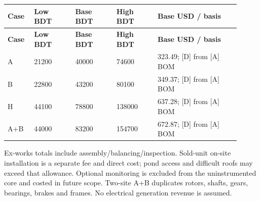 \documentclass[11pt,a4paper]{article}
\begin{document}
{\small
\setlength{\tabcolsep}{3pt}\renewcommand{\arraystretch}{1.18}
\begin{longtable}{@{}>{\raggedright\arraybackslash}p{0.1071\linewidth}>{\raggedright\arraybackslash}p{0.1606\linewidth}>{\raggedright\arraybackslash}p{0.1606\linewidth}>{\raggedright\arraybackslash}p{0.1606\linewidth}>{\raggedright\arraybackslash}p{0.3212\linewidth}@{}}
\toprule \textbf{Case} & \textbf{Low BDT} & \textbf{Base BDT} & \textbf{High BDT} & \textbf{Base USD / basis} \\ \midrule
\endfirsthead\toprule \textbf{Case} & \textbf{Low BDT} & \textbf{Base BDT} & \textbf{High BDT} & \textbf{Base USD / basis} \\ \midrule
\endhead\bottomrule\endfoot
A & \num{21200} & \num{40000} & \num{74600} & \num{323.49}; [D] from [A] BOM \\
B & \num{22800} & \num{43200} & \num{80100} & \num{349.37}; [D] from [A] BOM \\
H & \num{44100} & \num{78800} & \num{138000} & \num{637.28}; [D] from [A] BOM \\
A+B & \num{44000} & \num{83200} & \num{154700} & \num{672.87}; [D] from [A] BOM \\
\end{longtable}}
Ex-works totals include assembly/balancing/inspection. Sold-unit on-site installation is a separate fee and direct cost; pond access and difficult roofs may exceed that allowance. Optional monitoring is excluded from the uninstrumented core and costed in future scope. Two-site A+B duplicates rotors, shafts, gears, bearings, brakes and frames. No electrical generation revenue is assumed.
\end{document}
